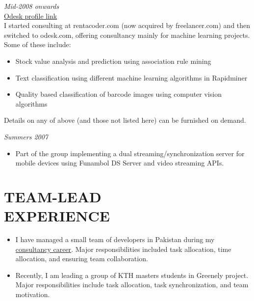 \documentclass[margin, 10pt]{res} %
\begin{document}
\begin{resume}
{\sl \textbf{}} \hfill \textit{Mid-2008 onwards} \\
{\color{RubineRed}{Odesk Corporation} \hfill \href{https://www.odesk.com/users/~013a228837c241737c}{Odesk profile link}} \\
I started consulting at rentacoder.com (now acquired by freelancer.com) and then switched to odesk.com, offering consultancy mainly for machine learning projects. Some of these include: 

\begin{itemize} \itemsep -2pt %
\item Stock value analysis and prediction using association rule mining
\item Text classification using different machine learning algorithms in Rapidminer 
\item Quality based classification of barcode images using computer vision algorithms
\end{itemize} 
Details on any of above (and those not listed here) can be furnished on demand.

{\sl \textbf{}} \hfill \textit{Summers 2007} \\
{\color{RubineRed}{Five Rivers Technologies, Lahore}}
\begin{itemize}
\item Part of the group implementing a dual streaming/synchronization server for mobile devices using Funambol DS Server and video streaming APIs.
\end{itemize} 

\section{TEAM-LEAD \\ EXPERIENCE}
\begin{itemize}
\item I have managed a small team of developers in Pakistan during my \href{https://www.odesk.com/users/~013a228837c241737c}{consultancy career}. Major responsibilities included task allocation, time allocation, and ensuring team collaboration.
\item Recently, I am leading a group of KTH masters students in Greenely project. Major responsibilities include task allocation, task synchronization, and team motivation.
\end{itemize}


\end{resume}
\end{document}
